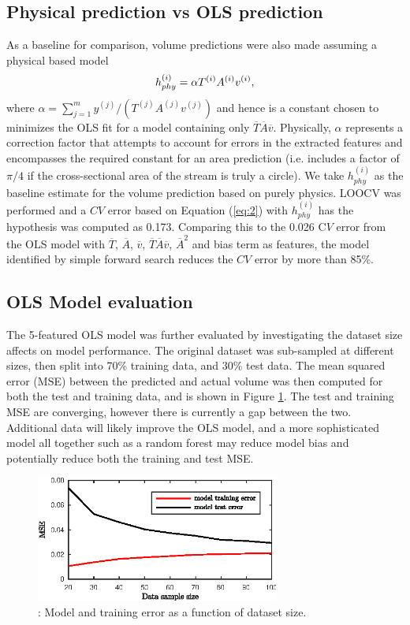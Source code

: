 \documentclass[twocolumn]{article}
\begin{document}
\subsection{Physical prediction vs OLS prediction} As a baseline for comparison, volume predictions were also made assuming a physical based model 
\begin{equation} \label{eq:3}
h^{(i)}_{phy} = \alpha T^{(i)} A^{(i)} v^{(i)}\\,
\end{equation}
where $\alpha = \sum^{m}_{j=1} y^{(j)}/(T^{(j)} A^{(j)} v^{(j)})$ and hence is a constant chosen to minimizes the OLS fit for a model containing only $\overline{T} \overline{A} \overline{v}$. Physically, $\alpha$ represents a correction factor that attempts to account for errors in the extracted features and encompasses the required constant for an area prediction (i.e. includes a factor of $\pi/4$ if the cross-sectional area of the stream is truly a circle). We take $h^{(i)}_{phy}$ as the baseline estimate for the volume prediction based on purely physics. LOOCV was performed and a $CV$ error based on Equation (\ref{eq:2}) with $h^{(i)}_{phy}$ has the hypothesis was computed as 0.173. Comparing this to the 0.026 C$V$ error from the OLS model with $\overline{T}$, $\overline{A}$, $\overline{v}$, $\overline{T} \overline{A} \overline{v}$, $\overline{A}^{2}$ and bias term as features, the model identified by simple forward search reduces the $CV$ error by more than 85\%.  

\subsection{OLS Model evaluation} The 5-featured OLS model was further evaluated by investigating the dataset size affects on model performance. The original dataset was sub-sampled at different sizes, then split into 70\% training data, and 30\% test data. The mean squared error (MSE) between the predicted and actual volume was then computed for both the test and training data, and is shown in Figure \ref{fig:ModelEval}. The test and training MSE are converging, however there is currently a gap between the two. Additional data will likely improve the OLS model, and a more sophisticated model all together such as a random forest may reduce model bias and potentially reduce both the training and test MSE.

\begin{figure}
\centering
 \includegraphics[width=80mm]{dataSampleSize}
 \caption{: Model and training error as a function of dataset size.}
 \label{fig:ModelEval}
 \end{figure}
\end{document}
